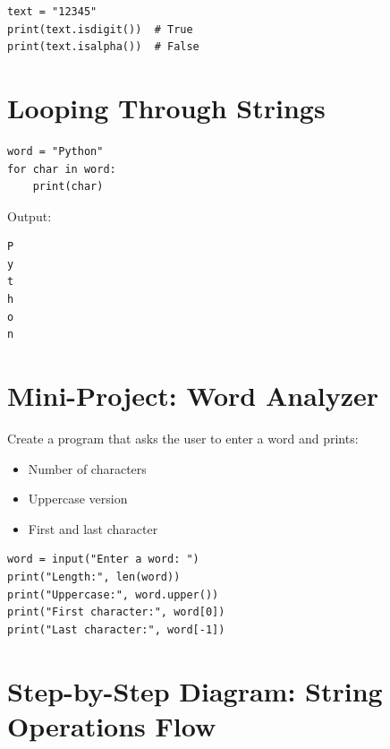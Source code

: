 \begin{verbatim}
text = "12345"
print(text.isdigit())  # True
print(text.isalpha())  # False
\end{verbatim}

\section{Looping Through Strings}

\begin{verbatim}
word = "Python"
for char in word:
    print(char)
\end{verbatim}

Output:

\begin{verbatim}
P
y
t
h
o
n
\end{verbatim}

\section{Mini-Project: Word Analyzer}

Create a program that asks the user to enter a word and prints:  

\begin{itemize}
    \item Number of characters  
    \item Uppercase version  
    \item First and last character  
\end{itemize}

\begin{verbatim}
word = input("Enter a word: ")
print("Length:", len(word))
print("Uppercase:", word.upper())
print("First character:", word[0])
print("Last character:", word[-1])
\end{verbatim}

\section{Step-by-Step Diagram: String Operations Flow}

\begin{center}
\end{center}


